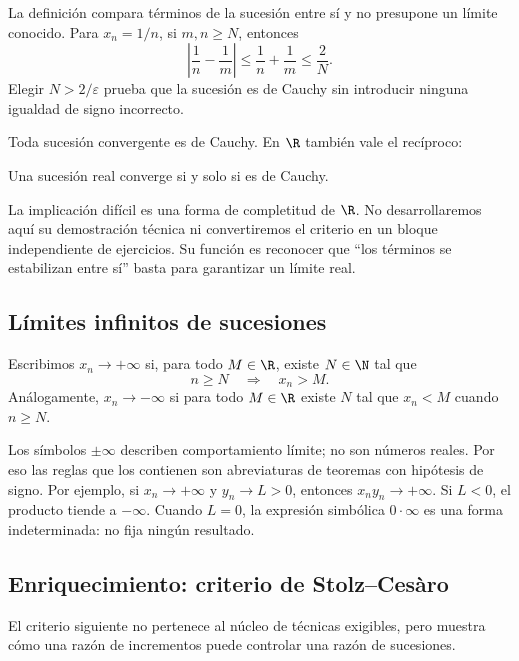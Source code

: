 La definición compara términos de la sucesión entre sí y no presupone un
límite conocido. Para \(x_n=1/n\), si \(m,n\ge N\), entonces
\[
  \left|\frac1n-\frac1m\right|
  \le \frac1n+\frac1m
  \le \frac2N.
\]
Elegir \(N>2/\varepsilon\) prueba que la sucesión es de Cauchy sin introducir
ninguna igualdad de signo incorrecto.

Toda sucesión convergente es de Cauchy. En \(\R\) también vale el recíproco:

\begin{teorema}
Una sucesión real converge si y solo si es de Cauchy.
\end{teorema}

La implicación difícil es una forma de completitud de \(\R\). No
desarrollaremos aquí su demostración técnica ni convertiremos el criterio en
un bloque independiente de ejercicios. Su función es reconocer que
``los términos se estabilizan entre sí'' basta para garantizar un límite real.

\subsection{Límites infinitos de sucesiones}

\begin{definicion}
Escribimos \(x_n\to+\infty\) si, para todo \(M\in\R\), existe
\(N\in\N\) tal que
\[
  n\ge N \quad\Longrightarrow\quad x_n>M.
\]
Análogamente, \(x_n\to-\infty\) si para todo \(M\in\R\) existe \(N\) tal
que \(x_n<M\) cuando \(n\ge N\).
\end{definicion}

Los símbolos \(\pm\infty\) describen comportamiento límite; no son números
reales. Por eso las reglas que los contienen son abreviaturas de teoremas con
hipótesis de signo. Por ejemplo, si \(x_n\to+\infty\) y \(y_n\to L>0\),
entonces \(x_ny_n\to+\infty\). Si \(L<0\), el producto tiende a
\(-\infty\). Cuando \(L=0\), la expresión simbólica \(0\cdot\infty\) es una
forma indeterminada: no fija ningún resultado.

\subsection{Enriquecimiento: criterio de Stolz--Cesàro}

El criterio siguiente no pertenece al núcleo de técnicas exigibles, pero
muestra cómo una razón de incrementos puede controlar una razón de sucesiones.


